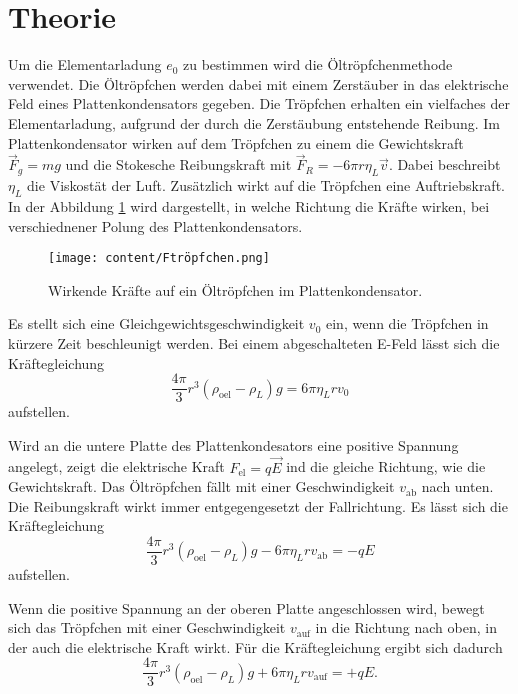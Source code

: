 \section{Theorie}
\label{sec:Theorie}
Um die Elementarladung $e_0$ zu bestimmen wird die Öltröpfchenmethode verwendet.
Die Öltröpfchen werden dabei mit einem Zerstäuber in das elektrische Feld eines Plattenkondensators gegeben.
Die Tröpfchen erhalten ein vielfaches der Elementarladung, aufgrund der durch die Zerstäubung entstehende Reibung.
Im Plattenkondensator wirken auf dem Tröpfchen zu einem die Gewichtskraft $\vec{F}_g = mg$ und die Stokesche Reibungskraft mit
$\vec{F}_R = -6 \pi r \eta_L \vec{v}$.
Dabei beschreibt $\eta_L$ die Viskostät der Luft.
Zusätzlich wirkt auf die Tröpfchen eine Auftriebskraft.
In der Abbildung \ref{fig:Ftröpfchen} wird dargestellt, in welche Richtung die Kräfte wirken, bei verschiednener Polung des Plattenkondensators.

\begin{figure}[H]
    \centering
    \texttt{[image: content/Ftröpfchen.png]}
    \caption{Wirkende Kräfte auf ein Öltröpfchen im Plattenkondensator.}
    \label{fig:Ftröpfchen}
\end{figure}

\noindent Es stellt sich eine Gleichgewichtsgeschwindigkeit $v_0$ ein, wenn die Tröpfchen in kürzere Zeit beschleunigt werden.
Bei einem abgeschalteten E-Feld lässt sich die Kräftegleichung 
\begin{equation}
    \label{Faus}
    \frac{4 \pi}{3} r^3 (\rho_\text{oel} - \rho_L) g = 6 \pi \eta_L r v_0
\end{equation}
aufstellen.

\noindent Wird an die untere Platte des Plattenkondesators eine positive Spannung angelegt, zeigt die elektrische Kraft $F_\text{el} = q \vec{E}$ ind die gleiche Richtung, wie die Gewichtskraft.
Das Öltröpfchen fällt mit einer Geschwindigkeit $v_\text{ab}$ nach unten. 
Die Reibungskraft wirkt immer entgegengesetzt der Fallrichtung.
Es lässt sich die Kräftegleichung
\begin{equation}
    \label{eq:Fvab}
    \frac{4 \pi}{3} r^3 (\rho_\text{oel} - \rho_L) g - 6 \pi \eta_L r v_\text{ab}= -q E
\end{equation}
aufstellen.

\noindent Wenn die positive Spannung an der oberen Platte angeschlossen wird, bewegt sich das Tröpfchen  mit einer Geschwindigkeit $v_\text{auf}$ in die Richtung nach oben,
in der auch die elektrische Kraft wirkt.
Für die Kräftegleichung ergibt sich dadurch
\begin{equation}
    \label{eq:Fvauf}
    \frac{4 \pi}{3} r^3 (\rho_\text{oel} - \rho_L) g + 6 \pi \eta_L r v_\text{auf}= +q E.
\end{equation}


